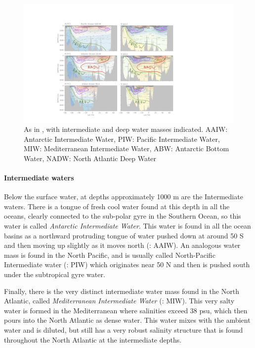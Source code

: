 \begin{figure}
  \centering
  \includegraphics[width=7in]{figs/WaterMasses/AnnotateSections}
    \caption{As in , with intermediate and deep water masses indicated.  AAIW: Antarctic Intermediate Water, PIW: Pacific Intermediate Water, MIW: Mediterranean Intermediate Water, ABW: Antarctic Bottom Water, NADW: North Atlantic Deep Water}
    \label{fig:AnnotateSections}  
\end{figure}


\paragraph{Intermediate waters} Below the surface water, at depths approximately 1000 m are the Intermediate waters.  There is a tongue of fresh cool water found at this depth in all the oceans, clearly connected to the sub-polar gyre in the Southern Ocean, so this water is called \emph{Antarctic Intermediate Water}.  This water is found in all the ocean basins as a northward protruding tongue of water pushed down at around 50 S and then moving up slightly as it moves north (: AAIW).  An analogous water mass is found in the North Pacific, and is usually called North-Pacific Intermediate water (: PIW) which originates near 50 N and then is pushed south under the subtropical gyre water.  

Finally, there is the very distinct intermediate water mass found in the North Atlantic, called \emph{Mediterranean Intermediate Water} (: MIW).  This very salty water is formed in the Mediterranean where salinities exceed 38 psu, which then pours into the North Atlantic as dense water.  This water mixes with the ambient water and is diluted, but still has a very robust salinity structure that is found throughout the North Atlantic at the intermediate depths.


